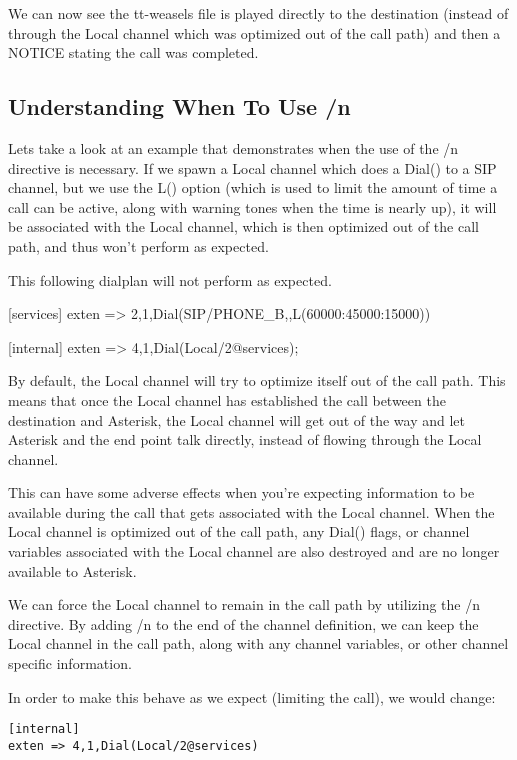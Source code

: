 We can now see the tt-weasels file is played directly to the destination
(instead of through the Local channel which was optimized out of the call path)
and then a NOTICE stating the call was completed.

\subsection{Understanding When To Use /n}

Lets take a look at an example that demonstrates when the use of the /n
directive is necessary. If we spawn a Local channel which does a Dial()
to a SIP channel, but we use the L() option (which is used to limit the
amount of time a call can be active, along with warning tones when the
time is nearly up), it will be associated with the Local channel,
which is then optimized out of the call path, and thus won't perform
as expected.

This following dialplan will not perform as expected.

[services]
exten => 2,1,Dial(SIP/PHONE_B,,L(60000:45000:15000))

[internal]
exten => 4,1,Dial(Local/2@services);

By default, the Local channel will try to optimize itself out of the call path.
This means that once the Local channel has established the call between the
destination and Asterisk, the Local channel will get out of the way and let
Asterisk and the end point talk directly, instead of flowing through the Local
channel.

This can have some adverse effects when you're expecting information to be
available during the call that gets associated with the Local channel. When the
Local channel is optimized out of the call path, any Dial() flags, or channel
variables associated with the Local channel are also destroyed and are no longer
available to Asterisk.

We can force the Local channel to remain in the call path by utilizing the /n
directive. By adding /n to the end of the channel definition, we can keep the
Local channel in the call path, along with any channel variables, or other
channel specific information.

In order to make this behave as we expect (limiting the call), we would change:

\begin{verbatim}
[internal]
exten => 4,1,Dial(Local/2@services)
\end{verbatim}

